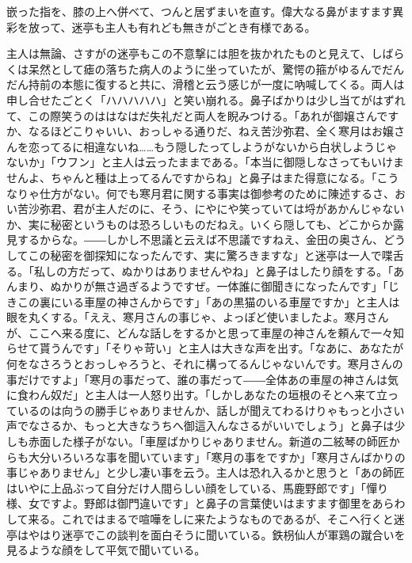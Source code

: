 \documentclass[12pt, openright]{book}
\begin{document}
嵌った指を、膝の上へ併べて、つんと居ずまいを直す。偉大なる鼻がますます異彩を放って、迷亭も主人も有れども無きがごとき有様である。

主人は無論、さすがの迷亭もこの不意撃には胆を抜かれたものと見えて、しばらくは呆然として瘧の落ちた病人のように坐っていたが、驚愕の箍がゆるんでだんだん持前の本態に復すると共に、滑稽と云う感じが一度に吶喊してくる。両人は申し合せたごとく「ハハハハハ」と笑い崩れる。鼻子ばかりは少し当てがはずれて、この際笑うのははなはだ失礼だと両人を睨みつける。「あれが御嬢さんですか、なるほどこりゃいい、おっしゃる通りだ、ねえ苦沙弥君、全く寒月はお嬢さんを恋ってるに相違ないね\ldots{}\ldots{}もう隠したってしようがないから白状しようじゃないか」「ウフン」と主人は云ったままである。「本当に御隠しなさってもいけませんよ、ちゃんと種は上ってるんですからね」と鼻子はまた得意になる。「こうなりゃ仕方がない。何でも寒月君に関する事実は御参考のために陳述するさ、おい苦沙弥君、君が主人だのに、そう、にやにや笑っていては埒があかんじゃないか、実に秘密というものは恐ろしいものだねえ。いくら隠しても、どこからか露見するからな。――しかし不思議と云えば不思議ですねえ、金田の奥さん、どうしてこの秘密を御探知になったんです、実に驚ろきますな」と迷亭は一人で喋舌る。「私しの方だって、ぬかりはありませんやね」と鼻子はしたり顔をする。「あんまり、ぬかりが無さ過ぎるようですぜ。一体誰に御聞きになったんです」「じきこの裏にいる車屋の神さんからです」「あの黒猫のいる車屋ですか」と主人は眼を丸くする。「ええ、寒月さんの事じゃ、よっぽど使いましたよ。寒月さんが、ここへ来る度に、どんな話しをするかと思って車屋の神さんを頼んで一々知らせて貰うんです」「そりゃ苛い」と主人は大きな声を出す。「なあに、あなたが何をなさろうとおっしゃろうと、それに構ってるんじゃないんです。寒月さんの事だけですよ」「寒月の事だって、誰の事だって――全体あの車屋の神さんは気に食わん奴だ」と主人は一人怒り出す。「しかしあなたの垣根のそとへ来て立っているのは向うの勝手じゃありませんか、話しが聞えてわるけりゃもっと小さい声でなさるか、もっと大きなうちへ御這入んなさるがいいでしょう」と鼻子は少しも赤面した様子がない。「車屋ばかりじゃありません。新道の二絃琴の師匠からも大分いろいろな事を聞いています」「寒月の事をですか」「寒月さんばかりの事じゃありません」と少し凄い事を云う。主人は恐れ入るかと思うと「あの師匠はいやに上品ぶって自分だけ人間らしい顔をしている、馬鹿野郎です」「憚り様、女ですよ。野郎は御門違いです」と鼻子の言葉使いはますます御里をあらわして来る。これではまるで喧嘩をしに来たようなものであるが、そこへ行くと迷亭はやはり迷亭でこの談判を面白そうに聞いている。鉄枴仙人が軍鶏の蹴合いを見るような顔をして平気で聞いている。
\end{document}
